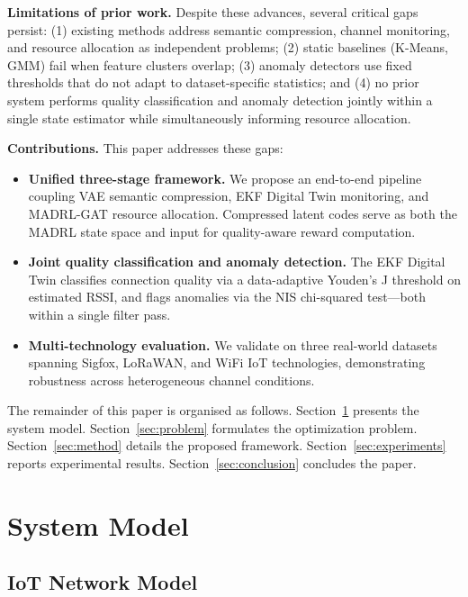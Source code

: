 \documentclass[conference]{IEEEtran}
\begin{document}
\textbf{Limitations of prior work.}
Despite these advances, several critical gaps persist: (1) existing methods
address semantic compression, channel monitoring, and resource allocation
as independent problems; (2) static baselines (K-Means, GMM) fail when
feature clusters overlap; (3) anomaly detectors use fixed thresholds
that do not adapt to dataset-specific statistics; and (4) no prior system
performs quality classification and anomaly detection jointly within a
single state estimator while simultaneously informing resource allocation.

\textbf{Contributions.} This paper addresses these gaps:
\begin{itemize}
\item \textbf{Unified three-stage framework.} We propose an end-to-end
pipeline coupling VAE semantic compression, EKF Digital Twin monitoring,
and MADRL-GAT resource allocation. Compressed latent codes serve as both
the MADRL state space and input for quality-aware reward computation.
\item \textbf{Joint quality classification and anomaly detection.}
The EKF Digital Twin classifies connection quality via a data-adaptive
Youden's J threshold on estimated RSSI, and flags anomalies via the NIS
chi-squared test—both within a single filter pass.
\item \textbf{Multi-technology evaluation.} We validate on three real-world
datasets spanning Sigfox, LoRaWAN, and WiFi IoT technologies, demonstrating
robustness across heterogeneous channel conditions.
\end{itemize}

The remainder of this paper is organised as follows. Section~\ref{sec:model}
presents the system model. Section~\ref{sec:problem} formulates the
optimization problem. Section~\ref{sec:method} details the proposed
framework. Section~\ref{sec:experiments} reports experimental results.
Section~\ref{sec:conclusion} concludes the paper.

\section{System Model}
\label{sec:model}

\subsection{IoT Network Model}
\end{document}
